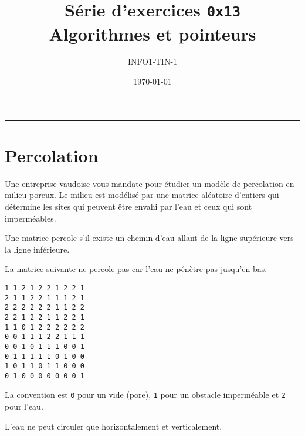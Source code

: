 



\date{\today}
\author{INFO1-TIN-1}
\title{Série d'exercices \texttt{0x13} \\ \textbf{Algorithmes et pointeurs}}
\maketitle

\noindent\rule{\textwidth}{.3pt}


\section{Percolation}

Une entreprise vaudoise vous mandate pour étudier un modèle de percolation en milieu poreux. Le milieu est modélisé par une matrice aléatoire d'entiers qui détermine les sites qui peuvent être envahi par l'eau et ceux qui sont imperméables. 

Une matrice percole s'il existe un chemin d'eau allant de la ligne supérieure vers la ligne inférieure. 

La matrice suivante ne percole pas car l'eau ne pénètre pas jusqu'en bas. 

\begin{lstlisting}
1 1 2 1 2 2 1 2 2 1
2 1 1 2 2 1 1 1 2 1
2 2 2 2 2 2 1 1 2 2
2 2 1 2 2 1 1 2 2 1
1 1 0 1 2 2 2 2 2 2
0 0 1 1 1 2 2 1 1 1 
0 0 1 0 1 1 1 0 0 1 
0 1 1 1 1 1 0 1 0 0
1 0 1 1 0 1 1 0 0 0 
0 1 0 0 0 0 0 0 0 1
\end{lstlisting}

La convention est \lstinline{0} pour un vide (pore), \lstinline{1} pour un obstacle imperméable et \lstinline{2} pour l'eau.

L'eau ne peut circuler que horizontalement et verticalement.



